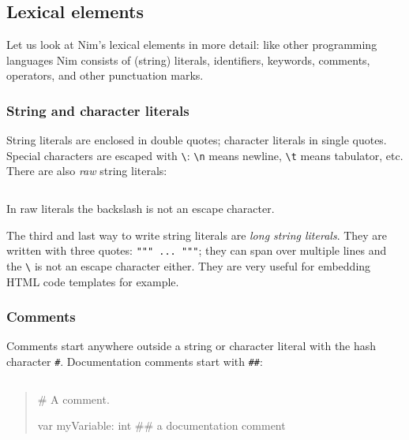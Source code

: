 \hypertarget{lexical-elements}{%
\subsection{Lexical elements}\label{lexical-elements}}

Let us look at Nim's lexical elements in more detail: like other
programming languages Nim consists of (string) literals, identifiers,
keywords, comments, operators, and other punctuation marks.

\hypertarget{string-and-character-literals}{%
\subsubsection{String and character
literals}\label{string-and-character-literals}}

String literals are enclosed in double quotes; character literals in
single quotes. Special characters are escaped with
\texttt{\textbackslash{}}: \texttt{\textbackslash{}n} means newline,
\texttt{\textbackslash{}t} means tabulator, etc. There are also
\emph{raw} string literals:

\begin{verbatim}
\end{verbatim}

In raw literals the backslash is not an escape character.

The third and last way to write string literals are \emph{long string
literals}. They are written with three quotes: \texttt{"""\ ...\ """};
they can span over multiple lines and the \texttt{\textbackslash{}} is
not an escape character either. They are very useful for embedding HTML
code templates for example.

\hypertarget{comments}{%
\subsubsection{Comments}\label{comments}}

Comments start anywhere outside a string or character literal with the
hash character \texttt{\#}. Documentation comments start with
\texttt{\#\#}:

\begin{verbatim}
\end{verbatim}

\begin{quote}
\# A comment.

var myVariable: int \#\# a documentation comment
\end{quote}


